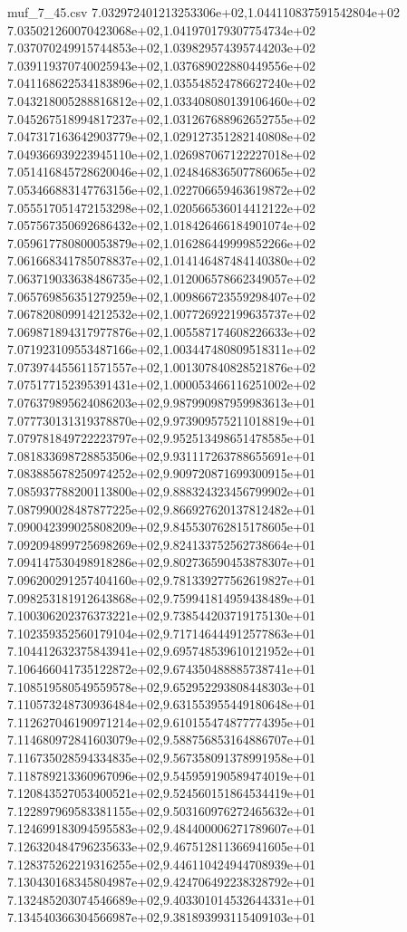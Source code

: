 \begin{filecontents*}{muf_7_45.csv}
7.032972401213253306e+02,1.044110837591542804e+02
7.035021260070423068e+02,1.041970179307754734e+02
7.037070249915744853e+02,1.039829574395744203e+02
7.039119370740025943e+02,1.037689022880449556e+02
7.041168622534183896e+02,1.035548524786627240e+02
7.043218005288816812e+02,1.033408080139106460e+02
7.045267518994817237e+02,1.031267688962652755e+02
7.047317163642903779e+02,1.029127351282140808e+02
7.049366939223945110e+02,1.026987067122227018e+02
7.051416845728620046e+02,1.024846836507786065e+02
7.053466883147763156e+02,1.022706659463619872e+02
7.055517051472153298e+02,1.020566536014412122e+02
7.057567350692686432e+02,1.018426466184901074e+02
7.059617780800053879e+02,1.016286449999852266e+02
7.061668341785078837e+02,1.014146487484140380e+02
7.063719033638486735e+02,1.012006578662349057e+02
7.065769856351279259e+02,1.009866723559298407e+02
7.067820809914212532e+02,1.007726922199635737e+02
7.069871894317977876e+02,1.005587174608226633e+02
7.071923109553487166e+02,1.003447480809518311e+02
7.073974455611571557e+02,1.001307840828521876e+02
7.075177152395391431e+02,1.000053466116251002e+02
7.076379895624086203e+02,9.987990987959983613e+01
7.077730131319378870e+02,9.973909575211018819e+01
7.079781849722223797e+02,9.952513498651478585e+01
7.081833698728853506e+02,9.931117263788655691e+01
7.083885678250974252e+02,9.909720871699300915e+01
7.085937788200113800e+02,9.888324323456799902e+01
7.087990028487877225e+02,9.866927620137812482e+01
7.090042399025808209e+02,9.845530762815178605e+01
7.092094899725698269e+02,9.824133752562738664e+01
7.094147530498918286e+02,9.802736590453878307e+01
7.096200291257404160e+02,9.781339277562619827e+01
7.098253181912643868e+02,9.759941814959438489e+01
7.100306202376373221e+02,9.738544203719175130e+01
7.102359352560179104e+02,9.717146444912577863e+01
7.104412632375843941e+02,9.695748539610121952e+01
7.106466041735122872e+02,9.674350488885738741e+01
7.108519580549559578e+02,9.652952293808448303e+01
7.110573248730936484e+02,9.631553955449180648e+01
7.112627046190971214e+02,9.610155474877774395e+01
7.114680972841603079e+02,9.588756853164886707e+01
7.116735028594334835e+02,9.567358091378991958e+01
7.118789213360967096e+02,9.545959190589474019e+01
7.120843527053400521e+02,9.524560151864534419e+01
7.122897969583381155e+02,9.503160976272465632e+01
7.124699183094595583e+02,9.484400006271789607e+01
7.126320484796235633e+02,9.467512811366941605e+01
7.128375262219316255e+02,9.446110424944708939e+01
7.130430168345804987e+02,9.424706492238328792e+01
7.132485203074546689e+02,9.403301014532644331e+01
7.134540366304566987e+02,9.381893993115409103e+01

\end{filecontents*}
